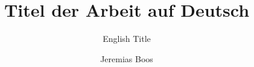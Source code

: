 \documentclass[envcountsame,envcountchap, deutsch]{i-studis}
\begin{document}
\title{Titel der Arbeit auf Deutsch}
\subtitle{English Title}
\author{Jeremias Boos} 							%
\address{Trier,} 							%
\submitdate{\today} 				%
\begingroup
  \renewcommand{\thepage}{2D Pixel Perfect Shadows}
  \mytitlepage
  \newpage
\endgroup
\frontmatter 
\tableofcontents 						%
\mainmatter                        		%



%
%
%
%

\backmatter                        		%
\printindex 							%
\begin{appendix}						%
\end{appendix}
\end{document}
